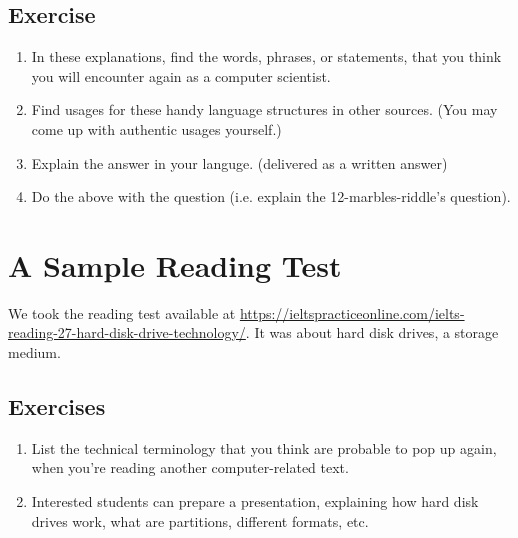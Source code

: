 \documentclass{article}
\begin{document}
\subsection{Exercise}
\begin{enumerate}
	\item In these explanations, find the words, phrases, or statements, that you think you will encounter again as a computer scientist.
	\item Find usages for these handy language structures in other sources. (You may come up with authentic usages yourself.)
	\item Explain the answer in your languge. (delivered as a written answer)
	\item Do the above with the question (i.e. explain the 12-marbles-riddle's question).
\end{enumerate}
\section{A Sample Reading Test}
We took the reading test available at \href{https://ieltspracticeonline.com/ielts-reading-27-hard-disk-drive-technology/}{https://ieltspracticeonline.com/ielts-reading-27-hard-disk-drive-technology/}. It was about hard disk drives, a storage medium.
\subsection{Exercises}
\begin{enumerate}
	\item List the technical terminology that you think are probable to pop up again, when you're reading another computer-related text.
	\item Interested students can prepare a presentation, explaining how hard disk drives work, what are partitions, different formats, etc. 
\end{enumerate}
\end{document}
